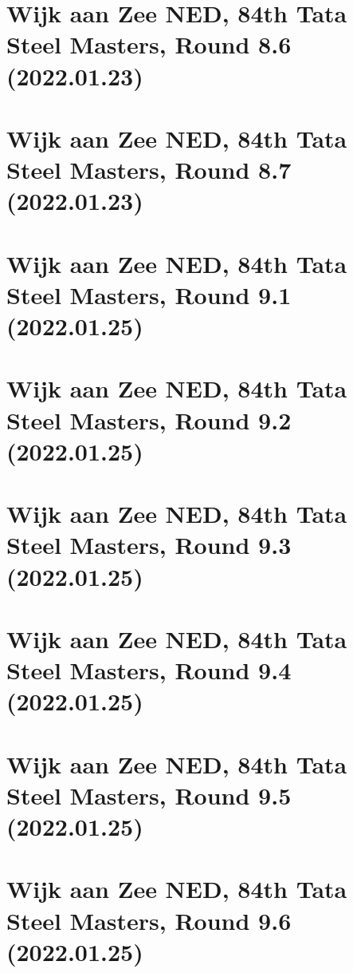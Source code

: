 \documentclass[11pt]{article}
\newcommand*\cleartoleftpage{%
   \clearpage
   \ifodd\value{page}\hbox{}\newpage\fi
}
\begin{document}
\cleartoleftpage

\section{Wijk aan Zee NED, 84th Tata Steel Masters, Round 8.6 (2022.01.23)}


\cleartoleftpage

\section{Wijk aan Zee NED, 84th Tata Steel Masters, Round 8.7 (2022.01.23)}


\cleartoleftpage

\section{Wijk aan Zee NED, 84th Tata Steel Masters, Round 9.1 (2022.01.25)}


\cleartoleftpage

\section{Wijk aan Zee NED, 84th Tata Steel Masters, Round 9.2 (2022.01.25)}


\cleartoleftpage

\section{Wijk aan Zee NED, 84th Tata Steel Masters, Round 9.3 (2022.01.25)}


\cleartoleftpage

\section{Wijk aan Zee NED, 84th Tata Steel Masters, Round 9.4 (2022.01.25)}


\cleartoleftpage

\section{Wijk aan Zee NED, 84th Tata Steel Masters, Round 9.5 (2022.01.25)}


\cleartoleftpage

\section{Wijk aan Zee NED, 84th Tata Steel Masters, Round 9.6 (2022.01.25)}

\end{document}
